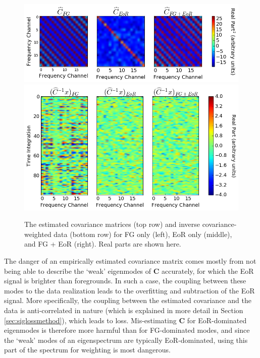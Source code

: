 \documentclass[preprint2,numberedappendix,tighten]{aastex6}  %
\begin{document}
\begin{figure}
	\centering
	\includegraphics[trim={0cm 0cm 0cm 0cm},clip,width=\columnwidth]{plots/toy_sigloss12.png}
	\includegraphics[trim={0cm 0cm 0cm 0cm},clip,width=\columnwidth]{plots/toy_sigloss13.png}
	\caption{The estimated covariance matrices (top row) and inverse covariance-weighted data (bottom row) for FG only (left), EoR only 
(middle), and FG + EoR (right). Real parts are shown here.}
	\label{fig:toy_sigloss12}
\end{figure}

The danger of an empirically estimated covariance matrix comes mostly from not being able to describe the `weak' eigenmodes of $
\textbf{C}$ accurately, for which the EoR signal is brighter than foregrounds. In such a case, the coupling between these modes to the data realization leads to the overfitting and subtraction of the EoR signal. More specifically, the coupling between the estimated covariance and the data is anti-correlated in nature (which is explained in more detail in Section \ref{sec:siglossmethod}), which leads to loss. Mis-estimating $\textbf{C}$ for EoR-dominated eigenmodes is therefore more harmful than for FG-dominated modes, and since the `weak' modes of an eigenspectrum are typically EoR-dominated, using this part of the spectrum for weighting is most dangerous.
\end{document}
